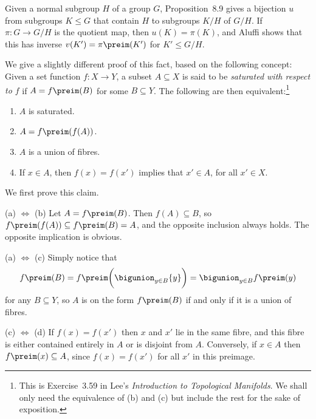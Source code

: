 \documentclass[article, a4paper, 11pt, oneside]{memoir}
\numberwithin{equation}{chapter}
\theoremstyle{nonumberplain}
\begin{document}
\begin{remark}
    Given a normal subgroup $H$ of a group $G$, Proposition~8.9 gives a bijection $u$ from subgroups $K \leq G$ that contain $H$ to subgroups $K/H$ of $G/H$. If $\pi \colon G \to G/H$ is the quotient map, then $u(K) = \pi(K)$, and Aluffi shows that this has inverse $v(K') = \pi\preim(K')$ for $K' \leq G/H$.

    We give a slightly different proof of this fact, based on the following concept: Given a set function $f \colon X \to Y$, a subset $A \subseteq X$ is said to be \emph{saturated with respect to $f$} if $A = f\preim(B)$ for some $B \subseteq Y$. The following are then equivalent:\footnote{This is Exercise~3.59 in Lee's \emph{Introduction to Topological Manifolds}. We shall only need the equivalence of (b) and (c) but include the rest for the sake of exposition.}
    \begin{enumerate}
        \item $A$ is saturated.
        \item $A = f\preim(f(A))$.
        \item $A$ is a union of fibres.
        \item If $x \in A$, then $f(x) = f(x')$ implies that $x' \in A$, for all $x' \in X$.
    \end{enumerate}
    We first prove this claim.

    \begin{proofsec}
        \item[(a) $\Leftrightarrow$ (b)]
        Let $A = f\preim(B)$. Then $f(A) \subseteq B$, so $f\preim(f(A)) \subseteq f\preim(B) = A$, and the opposite inclusion always holds. The opposite implication is obvious.

        \item[(a) $\Leftrightarrow$ (c)]
        Simply notice that
        \begin{equation*}
            f\preim(B)
                = f\preim \biggl( \bigunion_{y \in B} \{y\} \biggr)
                = \bigunion_{y \in B} f\preim(y)
        \end{equation*}
        for any $B \subseteq Y$, so $A$ is on the form $f\preim(B)$ if and only if it is a union of fibres.

        \item[(c) $\Leftrightarrow$ (d)]
        If $f(x) = f(x')$ then $x$ and $x'$ lie in the same fibre, and this fibre is either contained entirely in $A$ or is disjoint from $A$. Conversely, if $x \in A$ then $f\preim(x) \subseteq A$, since $f(x) = f(x')$ for all $x'$ in this preimage.
    \end{proofsec}


\end{remark}
\end{document}
